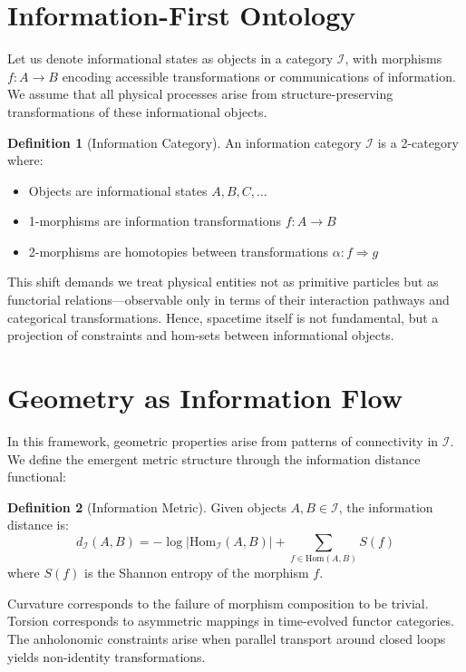 \documentclass[11pt]{article}
\theoremstyle{definition}
\newtheorem{definition}{Definition}[section]
\theoremstyle{remark}
\begin{document}
\section{Information-First Ontology}

Let us denote informational states as objects in a category \( \mathcal{I} \), with morphisms \( f: A \to B \) encoding accessible transformations or communications of information. We assume that all physical processes arise from structure-preserving transformations of these informational objects.

\begin{definition}[Information Category]
An information category \( \mathcal{I} \) is a 2-category where:
\begin{itemize}
\item Objects are informational states \( A, B, C, \ldots \)
\item 1-morphisms are information transformations \( f: A \to B \)
\item 2-morphisms are homotopies between transformations \( \alpha: f \Rightarrow g \)
\end{itemize}
\end{definition}

This shift demands we treat physical entities not as primitive particles but as functorial relations---observable only in terms of their interaction pathways and categorical transformations. Hence, spacetime itself is not fundamental, but a projection of constraints and hom-sets between informational objects.

\section{Geometry as Information Flow}

In this framework, geometric properties arise from patterns of connectivity in \( \mathcal{I} \). We define the emergent metric structure through the information distance functional:

\begin{definition}[Information Metric]
Given objects \( A, B \in \mathcal{I} \), the information distance is:
\[ d_{\mathcal{I}}(A, B) = -\log|\text{Hom}_{\mathcal{I}}(A, B)| + \sum_{f \in \text{Hom}(A,B)} S(f) \]
where \( S(f) \) is the Shannon entropy of the morphism \( f \).
\end{definition}

Curvature corresponds to the failure of morphism composition to be trivial. Torsion corresponds to asymmetric mappings in time-evolved functor categories. The anholonomic constraints arise when parallel transport around closed loops yields non-identity transformations.
\end{document}
